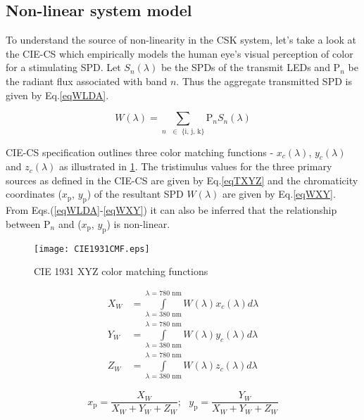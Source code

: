 \subsection{Non-linear system model}
\label{subsec:cskNonlinear}
To understand the source of non-linearity in the CSK system, let's take a look at the CIE-CS which empirically models the human eye's visual perception of color for a stimulating SPD. Let $S_{n}(\lambda)$ be the SPDs of the transmit LEDs and P$_{n}$ be the radiant flux associated with band $n$. Thus the aggregate transmitted SPD is given by Eq.\eqref{eqWLDA}.

\begin{equation}
	W(\lambda) = \sum\limits_{n\text{ }\in\text{ \{i, j, k\}}}\text{P}_{n}S_{n}(\lambda)
	\label{eqWLDA}
\end{equation}

CIE-CS specification outlines three color matching functions - $x_{c}(\lambda)$, $y_{c}(\lambda)$ and $z_{c}(\lambda)$ as illustrated in \figurename{ }\ref{figCIEXYZ}. The tristimulus values for the three primary sources as defined in the CIE-CS are given by Eq.\eqref{eqTXYZ} and the chromaticity coordinates ($x_{\text{p}}$, $y_{\text{p}}$) of the resultant SPD $W(\lambda)$ are given by Eq.\eqref{eqWXY}. From Eqs.(\ref{eqWLDA}-\ref{eqWXY}) it can also be inferred that the relationship between P$_{n}$ and ($x_{\text{p}}$, $y_{\text{p}}$) is non-linear.

\begin{figure}[!t]
	\centering
		\texttt{[image: CIE1931CMF.eps]}
	\caption{CIE 1931 XYZ color matching functions}
	\label{figCIEXYZ}
\end{figure}

\begin{equation}
	\begin{aligned}
		X_{W} &= \int\limits_{\lambda\text{ = 380 nm}}^{\lambda\text{ = 780 nm}}W(\lambda)x_{c}(\lambda)d\lambda\\
		Y_{W} &= \int\limits_{\lambda\text{ = 380 nm}}^{\lambda\text{ = 780 nm}}W(\lambda)y_{c}(\lambda)d\lambda\\
		Z_{W} &= \int\limits_{\lambda\text{ = 380 nm}}^{\lambda\text{ = 780 nm}}W(\lambda)z_{c}(\lambda)d\lambda
	\end{aligned}
	\label{eqTXYZ}
\end{equation}

\begin{equation}
	x_{\text{p}} = \frac{X_{W}}{X_{W}+Y_{W}+Z_{W}}; \text{  } y_{\text{p}} = \frac{Y_{W}}{X_{W}+Y_{W}+Z_{W}} %
	\label{eqWXY}
\end{equation}

